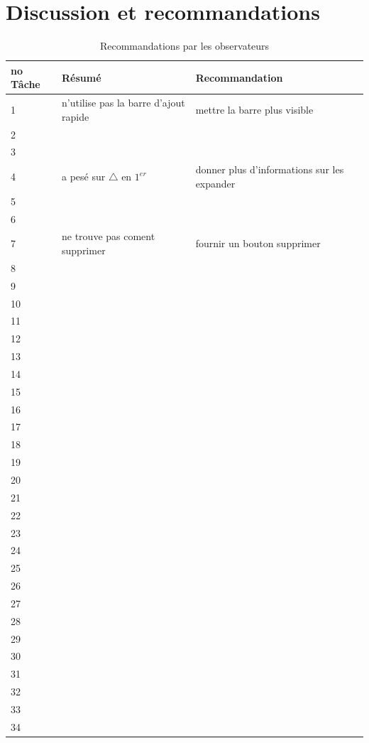 \documentclass[letterpaper, oneside, 12pt, these, creativecommons]{thETS}
\begin{document}
\newpage

\section{Discussion et recommandations}

\begin{table}
	\centering
	\begin{tabular}{|l|l|l|}
	\hline
	no Tâche	& Résumé	& Recommandation 	\\ \hline \hline
	1		&  n'utilise pas la barre d'ajout rapide		&  mettre la barre plus visible			\\ \hline
	2		& 							&  							\\ \hline
	3		& 							&  							\\ \hline
	4		& a pesé sur $\bigtriangleup$ en $1^{er}$	& donner plus d'informations sur les expander \\ \hline
	5		& 							&  							\\ \hline
	6		& 							&				  			\\ \hline
	7		& ne trouve pas coment supprimer		&  fournir un bouton supprimer			\\ \hline
	8		& 							&  							\\ \hline
	9		& 							&  							\\ \hline
	10		& 							&  							\\ \hline
	11		& 							&  							\\ \hline
	12		& 							&  							\\ \hline
	13		& 							&  							\\ \hline
	14		& 							&  							\\ \hline
	15		& 							&  							\\ \hline
	16		&							&  							\\ \hline
	17		& 							&  							\\ \hline
	18		& 							&  							\\ \hline
	19		& 							&  							\\ \hline
	20		& 							&  							\\ \hline
	21		& 							&  							\\ \hline
	22		& 							&  							\\ \hline
	23		& 							&  							\\ \hline
	24		& 							&  							\\ \hline
	25		& 							&  							\\ \hline
	26		& 							&  							\\ \hline
	27		& 							&  							\\ \hline
	28		& 							&  							\\ \hline
	29		& 							&  							\\ \hline
	30		& 							&  							\\ \hline
	31		& 							&  							\\ \hline
	32		& 							&  							\\ \hline
	33		& 							&  							\\ \hline
	34		& 							&  							\\ \hline
	\end{tabular}
	\caption{Recommandations par les observateurs}
\end{table}
\end{document}
